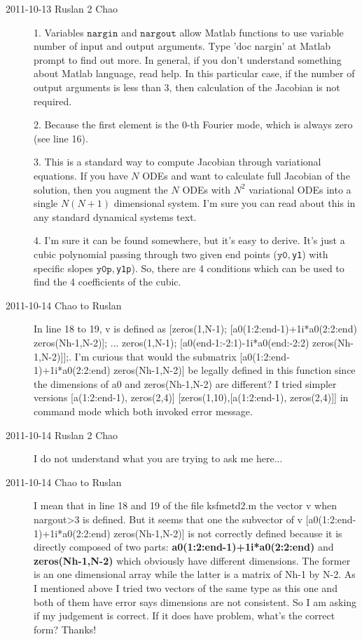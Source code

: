 \begin{description}
\item[2011-10-13 Ruslan 2 Chao]

1. Variables $\texttt{nargin}$ and $\texttt{nargout}$ allow Matlab functions to use variable number of input and output arguments.  Type 'doc nargin' at Matlab prompt to find out more.  In general, if you don't understand something about Matlab language, read help.  In this particular case, if the number of output arguments is less than 3, then calculation of the Jacobian is not required.

2. Because the first element is the 0-th Fourier mode, which is always zero (see line 16).

3. This is a standard way to compute Jacobian through variational equations.  If you have $N$ ODEs and want to calculate full Jacobian of the solution, then you augment the $N$ ODEs with $N^2$ variational ODEs into a single $N(N+1)$ dimensional system.  I'm sure you can read about this in any standard dynamical systems text.

4. I'm sure it can be found somewhere, but it's easy to derive.  It's just a cubic polynomial passing through two given end points ($\texttt{y0}, $\texttt{y1}) with specific slopes $\texttt{y0p}, $\texttt{y1p}).  So, there are 4 conditions which can be used to find the 4 coefficients of the cubic.

\item[2011-10-14 Chao to Ruslan]

In line 18 to 19, v is defined as [zeros(1,N-1); [a0(1:2:end-1)+1i*a0(2:2:end) zeros(Nh-1,N-2)]; ...
zeros(1,N-1); [a0(end-1:-2:1)-1i*a0(end:-2:2) zeros(Nh-1,N-2)]];. I'm curious that would the submatrix [a0(1:2:end-1)+1i*a0(2:2:end) zeros(Nh-1,N-2)] be legally defined in this function since the dimensions of a0 and zeros(Nh-1,N-2) are different? I tried simpler versions [a(1:2:end-1), zeros(2,4)] [zeros(1,10),[a(1:2:end-1), zeros(2,4)]] in command mode which both invoked error message.

\item[2011-10-14 Ruslan 2 Chao]

I do not understand what you are trying to ask me here...

\item[2011-10-14 Chao to Ruslan]
I mean that in line 18 and 19 of the file ksfmetd2.m the vector v when nargout>3 is defined. But it seems that one the subvector of v [a0(1:2:end-1)+1i*a0(2:2:end) zeros(Nh-1,N-2)] is not correctly defined because it is directly composed of two parts: \textbf{a0(1:2:end-1)+1i*a0(2:2:end)} and \textbf{zeros(Nh-1,N-2)} which obviously have different dimensions. The former is an one dimensional array while the latter is a matrix of Nh-1 by N-2. As I mentioned above I tried two vectors of the same type as this one and both of them have error says dimensions are not consistent. So I am asking if my judgement is correct. If it does have problem, what's the correct form? Thanks!


\end{description}


